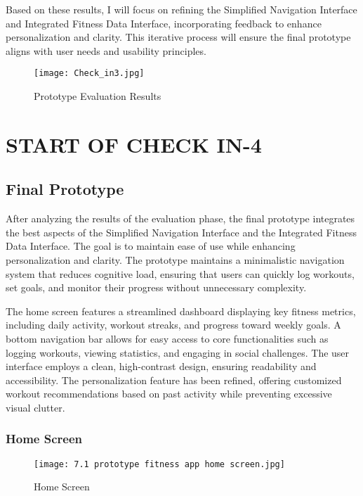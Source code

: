 \documentclass[
	letterpaper, %
]{jdf}
\begin{document}
Based on these results, I will focus on refining the Simplified Navigation Interface and Integrated Fitness Data Interface, incorporating feedback to enhance personalization and clarity. This iterative process will ensure the final prototype aligns with user needs and usability principles.

\begin{figure}
    \centering
    \texttt{[image: Check\_in3.jpg]}
    \caption{Prototype Evaluation Results}
    \label{fig:enter-label}
\end{figure}

\hfill

\section{START OF CHECK IN-4}
\subsection{Final Prototype}
After analyzing the results of the evaluation phase, the final prototype integrates the best aspects of the Simplified Navigation Interface and the Integrated Fitness Data Interface. The goal is to maintain ease of use while enhancing personalization and clarity. The prototype maintains a minimalistic navigation system that reduces cognitive load, ensuring that users can quickly log workouts, set goals, and monitor their progress without unnecessary complexity.

The home screen features a streamlined dashboard displaying key fitness metrics, including daily activity, workout streaks, and progress toward weekly goals. A bottom navigation bar allows for easy access to core functionalities such as logging workouts, viewing statistics, and engaging in social challenges. The user interface employs a clean, high-contrast design, ensuring readability and accessibility. The personalization feature has been refined, offering customized workout recommendations based on past activity while preventing excessive visual clutter. 
\subsubsection{Home Screen}
\begin{figure}
    \centering
    \texttt{[image: 7.1 prototype fitness app home screen.jpg]}
    \caption{Home Screen}
    \label{fig:enter-label}
\end{figure}
\end{document}
